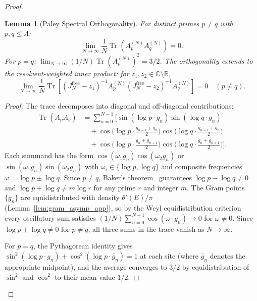 \documentclass{pre-aomart}
\theoremstyle{plain}
\newtheorem{lemma}[theorem]{Lemma}
\theoremstyle{definition}
\theoremstyle{remark}
\begin{document}
\begin{proof}
\begin{lemma}[Paley Spectral Orthogonality]\label{lem:paley_ortho}
For distinct primes $p \ne q$ with $p, q \le \Lambda$:
\begin{equation}\label{eq:paley_ortho}
\lim_{N\to\infty} \frac{1}{N}\operatorname{Tr}\!\left(A_p^{(N)} A_q^{(N)}\right) = 0.
\end{equation}
For $p = q$: $\lim_{N\to\infty} (1/N)\operatorname{Tr}(A_p^{(N)})^2 = 3/2$.
The orthogonality extends to the resolvent-weighted inner product:
for $z_1, z_2 \in \mathbb{C}\setminus\mathbb{R}$,
\[
\lim_{N\to\infty} \frac{1}{N}\operatorname{Tr}\!\left[
  (J_N^{\mathrm{free}}\!-\!z_1)^{-1} A_p^{(N)}
  (J_N^{\mathrm{free}}\!-\!z_2)^{-1} A_q^{(N)}
\right] = 0 \quad (p \ne q).
\]
\end{lemma}

\begin{proof}
The trace decomposes into diagonal and off-diagonal contributions:
\begin{align*}
\operatorname{Tr}(A_p A_q)
&= \sum_{n=0}^{N-1} \bigl[\sin(\log p\cdot g_n)\sin(\log q\cdot g_n) \\
&\quad+ \cos\!\bigl(\log p\cdot\tfrac{g_{n-1}+g_n}{2}\bigr)
   \cos\!\bigl(\log q\cdot\tfrac{g_{n-1}+g_n}{2}\bigr) \\
&\quad+ \cos\!\bigl(\log p\cdot\tfrac{g_n+g_{n+1}}{2}\bigr)
   \cos\!\bigl(\log q\cdot\tfrac{g_n+g_{n+1}}{2}\bigr)\bigr].
\end{align*}
Each summand has the form $\cos(\omega_1 g_n)\cos(\omega_2 g_n)$ or
$\sin(\omega_1 g_n)\sin(\omega_2 g_n)$ with $\omega_i \in \{\log p,\log q\}$
and composite frequencies $\omega = \log p \pm \log q$.
Since $p \ne q$, Baker's theorem~\cite{Baker1975} guarantees
$\log p - \log q \ne 0$ and $\log p + \log q \ne m\log r$
for any prime $r$ and integer $m$.
The Gram points $\{g_n\}$ are equidistributed with density
$\theta'(E)/\pi$ (Lemma~\ref{lem:gram_asymp_app}), so by the
Weyl equidistribution criterion every oscillatory sum satisfies
$(1/N)\sum_{n=0}^{N-1}\cos(\omega\cdot g_n) \to 0$ for $\omega \ne 0$.
Since $\log p \pm \log q \ne 0$ for $p \ne q$, all three
sums in the trace vanish as $N \to \infty$.

For $p = q$, the Pythagorean identity gives
$\sin^2(\log p\cdot g_n) + \cos^2(\log p\cdot\bar g_n) = 1$
at each site (where $\bar g_n$ denotes the appropriate midpoint),
and the average converges to $3/2$ by equidistribution
of $\sin^2$ and $\cos^2$ to their mean value $1/2$.


\end{proof}
\end{proof}
\end{document}
